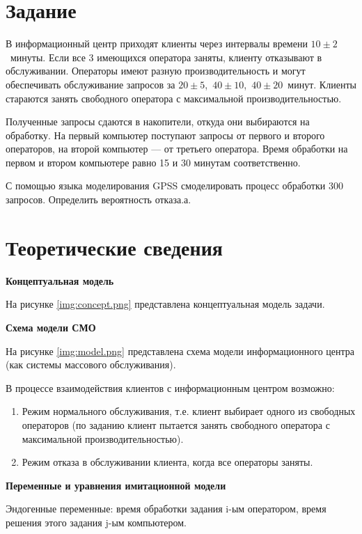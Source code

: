 \section*{Задание}

В информационный центр приходят клиенты через интервалы времени $10\pm2$~минуты.
Если все 3 имеющихся оператора заняты, клиенту отказывают в обслуживании.
Операторы имеют разную производительность и могут обеспечивать обслуживание
запросов за $20\pm5$,~$40\pm10$,~$40\pm20$~минут. Клиенты стараются
занять свободного оператора с максимальной производительностью.

Полученные запросы сдаются в накопители, откуда они выбираются на
обработку. На первый компьютер поступают запросы от первого и второго операторов, на
второй компьютер --- от третьего оператора. Время обработки на первом и втором
компьютере равно 15 и 30 минутам соответственно.

С помощью языка моделирования GPSS смоделировать процесс обработки 300 запросов. Определить вероятность отказа.а.

\section*{Теоретические сведения}
\textbf{Концептуальная модель}

На рисунке \ref{img:concept.png} представлена концептуальная модель задачи.

\textbf{Схема модели СМО}

На рисунке \ref{img:model.png} представлена схема модели информационного центра (как системы массового обслуживания).

В процессе взаимодействия клиентов с информационным центром возможно:
\begin{enumerate}
    \item Режим нормального обслуживания, т.е. клиент выбирает одного из свободных
операторов (по заданию клиент пытается занять свободного оператора с максимальной производительностью).
    \item Режим отказа в обслуживании клиента, когда все операторы заняты.
\end{enumerate}

\textbf{Переменные и уравнения имитационной модели}

Эндогенные переменные: время обработки задания i-ым оператором, время решения этого задания j-ым компьютером.

